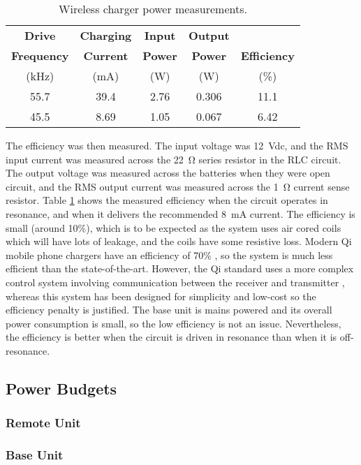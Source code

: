 \begin{table}[htbp]
	\begin{center}
	\begin{tabular}{|c|c|c|c|c|}
	\hline
	\textbf{Drive} & \textbf{Charging} & \textbf{Input} & \textbf{Output} & \\
	\textbf{Frequency} & \textbf{Current} & \textbf{Power} & \textbf{Power} & \textbf{Efficiency} \\
	(\si{\kilo\hertz}) & (\si{\milli\ampere}) & (\si{\watt}) & (\si{\watt}) & (\%)\\
	\hline
	55.7 & 39.4 & 2.76 & 0.306 & 11.1\\
	\hline
	45.5 & 8.69 & 1.05 & 0.067 & 6.42\\
	\hline	
	\end{tabular}
	\caption{Wireless charger power measurements.}
	\label{tab: efficiency}
	\end{center}
\end{table}

The efficiency was then measured. The input voltage was \SI{12}{\volt}dc, and the RMS input current was measured across the \SI{22}{\ohm} series resistor in the RLC circuit. The output voltage was measured across the batteries when they were open circuit, and the RMS output current was measured across the \SI{1}{\ohm} current sense resistor. Table \ref{tab: efficiency} shows the measured efficiency when the circuit operates in resonance, and when it delivers the recommended \SI{8}{\milli\ampere} current. The efficiency is small (around 10\%), which is to be expected as the system uses air cored coils which will have lots of leakage, and the coils have some resistive loss. Modern Qi mobile phone chargers have an efficiency of 70\% \cite{wireless_power_review}, so the system is much less efficient than the state-of-the-art. However, the Qi standard uses a more complex control system involving communication between the receiver and transmitter \cite{wireless_power_review}, whereas this system has been designed for simplicity and low-cost so the efficiency penalty is justified. The base unit is mains powered and its overall power consumption is small, so the low efficiency is not an issue. Nevertheless, the efficiency is better when the circuit is driven in resonance than when it is off-resonance.\\ %







\subsection{Power Budgets}\label{power budget}
\subsubsection{Remote Unit}



\subsubsection{Base Unit}